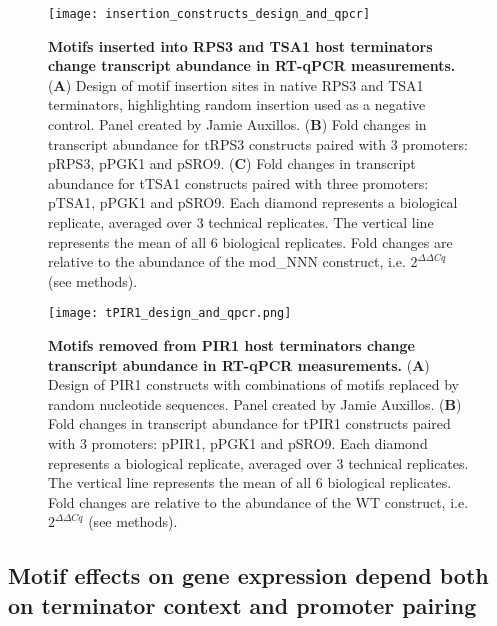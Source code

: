 \documentclass[../main.tex]{subfiles}
\begin{document}
\begin{figure}[p]

{\centering \texttt{[image: insertion\_constructs\_design\_and\_qpcr]} 

}

\caption[Motifs inserted into RPS3 and TSA1 host terminators change transcript abundance in RT-qPCR measurements.]{\textbf{Motifs inserted into RPS3 and TSA1 host terminators change transcript abundance in RT-qPCR measurements.} (\textbf{A}) Design of motif insertion sites in native RPS3 and TSA1 terminators, highlighting random insertion used as a negative control. Panel created by Jamie Auxillos. (\textbf{B}) Fold changes in transcript abundance for tRPS3 constructs paired with 3 promoters: pRPS3, pPGK1 and pSRO9. (\textbf{C}) Fold changes in transcript abundance for tTSA1 constructs paired with three promoters: pTSA1, pPGK1 and pSRO9. Each diamond represents a biological replicate, averaged over 3 technical replicates. The vertical line represents the mean of all 6 biological replicates. Fold changes are relative to the abundance of the mod\_NNN construct, i.e. $2^{\Delta\Delta Cq}$ (see methods).}\label{fig:tRPS3-tTSA1-design-and-qpcr}
\end{figure}

\begin{figure}[p]

{\centering \texttt{[image: tPIR1\_design\_and\_qpcr.png]} 

}

\caption[Motifs removed from PIR1 host terminators change transcript abundance in RT-qPCR measurements.]{\textbf{Motifs removed from PIR1 host terminators change transcript abundance in RT-qPCR measurements.} (\textbf{A}) Design of PIR1 constructs with combinations of motifs replaced by random nucleotide sequences. Panel created by Jamie Auxillos. (\textbf{B}) Fold changes in transcript abundance for tPIR1 constructs paired with 3 promoters: pPIR1, pPGK1 and pSRO9. Each diamond represents a biological replicate, averaged over 3 technical replicates. The vertical line represents the mean of all 6 biological replicates. Fold changes are relative to the abundance of the WT construct, i.e. $2^{\Delta\Delta Cq}$ (see methods).}\label{fig:tPIR1-design-and-qpcr}
\end{figure}

\subsection{Motif effects on gene expression depend both on terminator context and promoter pairing}
\end{document}
